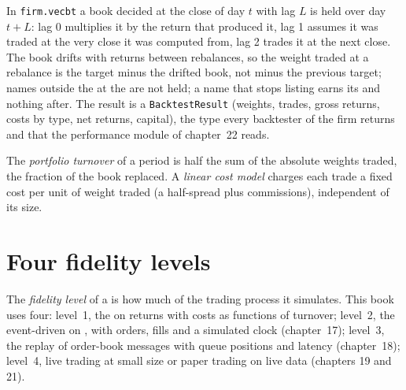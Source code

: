 In \texttt{firm.vecbt} a book decided at the close of day $t$ with lag $L$ is held over day $t + L$: lag 0 multiplies it by the return that
produced it, lag 1 assumes it was traded at the very close it was computed from, lag 2 trades it at the next close. The book drifts with
returns between rebalances, so the weight traded at a rebalance is the target minus the drifted book, not minus the previous target;
names outside the  at the  are not held; a name that stops listing earns its  and nothing
after. The result is a \texttt{BacktestResult} (weights, trades, gross returns, costs by type, net returns, capital), the type every
backtester of the firm returns and that the performance module of chapter~22 reads.

\begin{definition}\label{def:rs:vectorised-backtests:turnover}
The \emph{portfolio turnover} of a period is half the sum of the absolute weights traded, the fraction of the book
replaced. A \emph{linear cost model} charges each trade a fixed cost per unit of weight traded (a half-spread plus
commissions), independent of its size.
\end{definition}

\section{Four fidelity levels}

\begin{definition}\label{def:rs:vectorised-backtests:fidelity}
The \emph{fidelity level} of a  is how much of the trading process it simulates. This book uses four: level~1,
the  on  returns with costs as functions of turnover; level~2, the event-driven  on , with orders, fills and
a simulated clock (chapter~17); level~3, the replay of order-book messages with queue positions and latency (chapter~18); level~4, live trading
at small size or paper trading on live data (chapters 19 and 21).
\end{definition}

